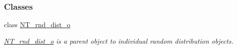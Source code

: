 \subsubsection*{Classes}
\begin{DoxyCompactItemize}
\item 
class \hyperlink{class_n_t__rnd__dist__o}{NT\_\-rnd\_\-dist\_\-o}
\begin{DoxyCompactList}\small\item\em \hyperlink{class_n_t__rnd__dist__o}{NT\_\-rnd\_\-dist\_\-o} is a parent object to individual random distribution objects. \item\end{DoxyCompactList}\end{DoxyCompactItemize}
